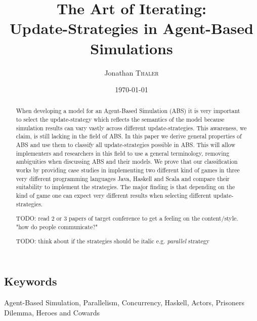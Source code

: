 \documentclass[twocolumn, 10pt]{article}
\title{The Art of Iterating:\\Update-Strategies in Agent-Based Simulations} %
\author{Jonathan \textsc{Thaler}} %
\date{\today} %
\begin{document}
%
\maketitle %

\begin{abstract}
When developing a model for an Agent-Based Simulation (ABS) it is very important to select the update-strategy which reflects the semantics of the model because simulation results can vary vastly across different update-strategies. This awareness, we claim, is still lacking in the field of ABS. In this paper we derive general properties of ABS and use them to classify all update-strategies possible in ABS. This will allow implementers and researchers in this field to use a general terminology, removing ambiguities when discussing ABS and their models. We prove that our classification works by providing case studies in implementing two different kind of games in three very different programming languages Java, Haskell and Scala and compare their suitability to implement the strategies. The major finding is that depending on the kind of game one can expect very different results when selecting different update-strategies.

TODO: read 2 or 3 papers of target conference to get a feeling on the content/style. "how do people communicate?"

TODO: think about if the strategies should be italic e.g. \textit{parallel} strategy
\end{abstract}

\subsection*{Keywords}
Agent-Based Simulation, Parallelism, Concurrency, Haskell, Actors, Prisoners Dilemma, Heroes and Cowards













\newpage



\end{document}
